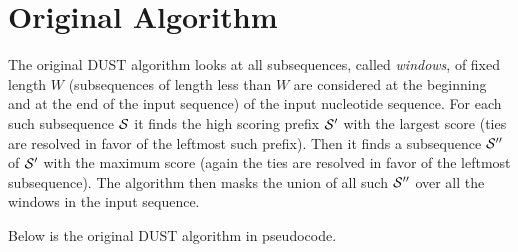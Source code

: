 \documentclass{article}
\newcommand{\cals}{{\cal S}}
\begin{document}
\section{Original Algorithm}

The original DUST algorithm looks at all subsequences, called {\em windows},
of fixed length $W$ (subsequences of length less than $W$ are considered at 
the beginning and at the end of the input sequence) of the input nucleotide 
sequence.  For each such subsequence $\cals$ it finds the high scoring prefix 
$\cals'$ with the largest score (ties are resolved in favor of the leftmost
such prefix). Then it finds a subsequence $\cals''$ of $\cals'$ with the maximum
score (again the ties are resolved in favor of the leftmost subsequence). 
The algorithm then masks the union of all such $\cals''$ over all the windows
in the input sequence.

Below is the original DUST algorithm in pseudocode.
\end{document}
